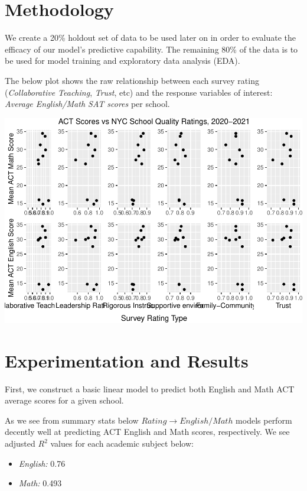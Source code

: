 \documentclass[
  man]{apa6}
\providecommand{\tightlist}{%
  \setlength{\itemsep}{0pt}\setlength{\parskip}{0pt}}
\begin{document}
\hypertarget{methodology}{%
\section{Methodology}\label{methodology}}

We create a 20\% holdout set of data to be used later on in order to evaluate the efficacy of our model's predictive capability. The remaining 80\% of the data is to be used for model training and exploratory data analysis (EDA).

The below plot shows the raw relationship between each survey rating (\emph{Collaborative Teaching}, \emph{Trust}, etc) and the response variables of interest: \emph{Average English/Math SAT scores} per school.

\includegraphics{final-project_files/figure-latex/plot-relationships-1.pdf}

\hypertarget{experimentation-and-results}{%
\section{Experimentation and Results}\label{experimentation-and-results}}

First, we construct a basic linear model to predict both English and Math ACT average scores for a given school.

As we see from summary stats below \(Rating \rightarrow English/Math\) models perform decently well at predicting ACT English and Math scores, respectively. We see adjusted \(R^2\) values for each academic subject below:

\begin{itemize}
\tightlist
\item
  \emph{English:} 0.76
\item
  \emph{Math:} 0.493
\end{itemize}
\end{document}
